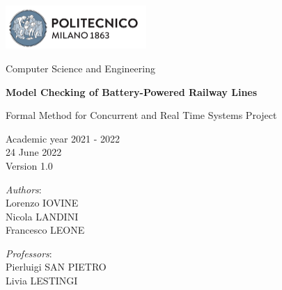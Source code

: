 
\usepackage{listings}





{\begin{titlepage}
     \begin{center}
         \includegraphics[width=0.4\textwidth]{images/PolimiLogo.png}

         \vspace{0.2cm}

         \Large Computer Science and Engineering

         \vspace{0.9cm}

         \Huge \textbf{Model Checking of Battery-Powered Railway Lines}

         \vspace{0.7cm}
         \huge Formal Method for Concurrent and Real Time Systems Project

         \vspace{1.5cm}
         \Large Academic year 2021 - 2022\\
         \vspace{1cm}
         24 June 2022\\Version 1.0
         \vspace{3cm}

         \large
         \begin{minipage}{.1\textwidth}
             \null
         \end{minipage}%
         \begin{minipage}{.4\textwidth}
             \textit{Authors}:\\
             Lorenzo IOVINE\\
             Nicola LANDINI\\
             Francesco LEONE
         \end{minipage}%
         \begin{minipage}{.4\textwidth}
             \raggedleft
             \textit{Professors}:\\
             Pierluigi SAN PIETRO\\
             Livia LESTINGI\\
             \phantom{placeholder}
         \end{minipage}%
         \begin{minipage}{.1\textwidth}
             \null
         \end{minipage}


     \end{center}
\end{titlepage}}~\\

